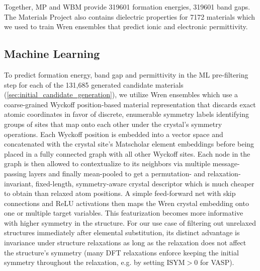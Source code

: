 \documentclass{article}
\begin{document}
Together, MP and WBM provide \num{319601} formation energies, \num{319601} band gaps. The Materials Project also contains dielectric properties for \num{7172} materials which we used to train Wren ensembles that predict ionic and electronic permittivity.


\subsection{Machine Learning}
\label{sec:ml}

To predict formation energy, band gap and permittivity in the ML pre-filtering step for each of the 131,685 generated candidate materials (\cref{sec:initial_candidate_generation}), we utilize Wren ensembles \cite{goodall_rapid_2022} which use a coarse-grained Wyckoff position-based material representation that discards exact atomic coordinates in favor of discrete, enumerable symmetry labels identifying groups of sites that map onto each other under the crystal's symmetry operations.
Each Wyckoff position is embedded into a vector space and concatenated with the crystal site's Matscholar element embeddings \cite{weston_named_2019} before being placed in a fully connected graph with all other Wyckoff sites.
Each node in the graph is then allowed to contextualize to its neighbors via multiple message-passing layers and finally mean-pooled to get a permutation- and relaxation-invariant, fixed-length, symmetry-aware crystal descriptor which is much cheaper to obtain than relaxed atom positions.
A simple feed-forward net with skip connections \cite{he_deep_2015} and ReLU \cite{nair_rectified_2010} activations then maps the Wren crystal embedding onto one or multiple target variables.
This featurization becomes more informative with higher symmetry in the structure.
For our use case of filtering out unrelaxed structures immediately after elemental substitution, its distinct advantage is invariance under structure relaxations as long as the relaxation does not affect the structure's symmetry (many DFT relaxations enforce keeping the initial symmetry throughout the relaxation, e.g.
by setting $\text{ISYM} > 0$ for VASP).
\end{document}
